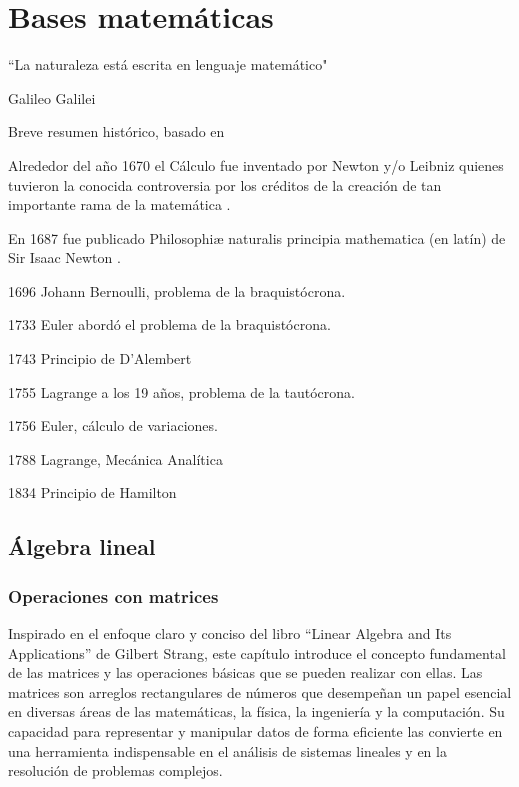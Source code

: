 \setchapterpreamble[u]{\margintoc}

\chapter{Bases matemáticas} \label{chap:mate}

\begin{kaobox}
	``La naturaleza está escrita en lenguaje matemático"
	\begin{flushright}
		Galileo Galilei
	\end{flushright}
\end{kaobox}

Breve resumen histórico, basado en \cite{GoodVibrations01}

Alrededor del año 1670 el Cálculo fue inventado por Newton y/o Leibniz quienes tuvieron
la conocida controversia por los créditos de la creación de tan importante rama de la
matemática \cite{guicciardini2003reading}.

En 1687 fue publicado Philosophiæ naturalis principia mathematica (en latín) de Sir Isaac Newton \cite{newton1987}.

1696 Johann Bernoulli, problema de la braquistócrona.

1733 Euler abordó el problema de la braquistócrona.

1743 Principio de D'Alembert

1755 Lagrange a los 19 años, problema de la tautócrona.

1756 Euler, cálculo de variaciones.

1788 Lagrange, Mecánica Analítica

1834 Principio de Hamilton


\section{Álgebra lineal}
\subsection{Operaciones con matrices}

Inspirado en el enfoque claro y conciso del libro ``Linear Algebra and Its Applications'' de Gilbert Strang, este capítulo introduce el concepto fundamental de las matrices y las operaciones básicas que se pueden realizar con ellas. Las matrices son arreglos rectangulares de números que desempeñan un papel esencial en diversas áreas de las matemáticas, la física, la ingeniería y la computación.  Su capacidad para representar y manipular datos de forma eficiente las convierte en una herramienta indispensable en el análisis de sistemas lineales y en la resolución de problemas complejos.

